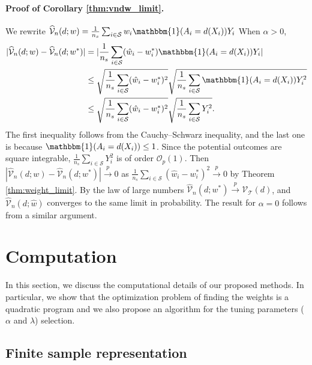 \documentclass[12pt]{article}
\newcommand{\ind}{\mathbbm{1}}
\begin{document}
\paragraph{Proof of Corollary \ref{thm:vndw_limit}.} 
We rewrite $\widehat{\mathcal{V}}_n(d; w) = \frac{1}{n_s} \sum_{i \in \mathcal{S}} w_i \ind(A_i = d(X_i)) Y_i$
When $\alpha > 0$,
\begin{align*}
	|\widehat{\mathcal{V}}_n(d; w) - \widehat{\mathcal{V}}_n(d; w^*)|
	&= |\frac{1}{n_s} \sum_{i \in \mathcal{S}} (\hat{w}_i - w^*_i) \ind(A_i = d(X_i)) Y_i| \\
	&\le \sqrt{ \frac{1}{n_s} \sum_{i \in \mathcal{S}} (\hat{w}_i - w^*_i)^2 }
	\sqrt{\frac{1}{n_s} \sum_{i \in \mathcal{S}} \ind(A_i = d(X_i)) Y_i^2 } \\
	&\le \sqrt{ \frac{1}{n_s} \sum_{i \in \mathcal{S}} (\hat{w}_i - w^*_i)^2 }
	\sqrt{\frac{1}{n_s} \sum_{i \in \mathcal{S}} Y_i^2 }
	.\end{align*}
The first inequality follows from the Cauchy–Schwarz inequality, and the last one is because $\ind(A_i = d(X_i)) \le 1$. Since the potential outcomes are square integrable, $\frac{1}{n_s} \sum_{i \in \mathcal{S}} Y_i^2$ is of order $\mathcal{O}_p(1)$.  Then $|\widehat{\mathcal{V}}_n(d; w) - \widehat{\mathcal{V}}_n(d; w^*)| \overset{p}{\longrightarrow} 0$ as $\frac{1}{n_s} \sum_{i \in \mathcal{S}} (\hat{w}_i - w^*_i)^2 \overset{p}{\longrightarrow} 0$ by Theorem \ref{thm:weight_limit}. By the law of large numbers $\widehat{\mathcal{V}}_n(d; w^*) \overset{p}{\longrightarrow} \mathcal{V}_\mathcal{T}(d)$, and $\widehat{\mathcal{V}}_n(d; \hat{w})$ converges to the same limit in probability. The result for $\alpha = 0$ follows from a similar argument.

\section{Computation}
\label{sec:computaton}
In this section, we discuss the computational details of our proposed methods. In particular, we show that the optimization problem of finding the weights is a quadratic program and we also propose an algorithm for the tuning parameters ($\alpha$ and $\lambda$) selection. 
\subsection{Finite sample representation}
\label{sec:finite_sample_representation}
\end{document}
